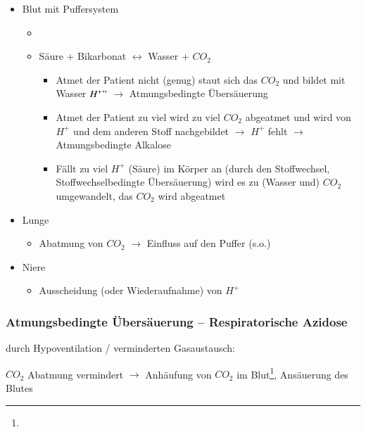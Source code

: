 \begin{itemize}
    \item Blut mit Puffersystem
    \begin{itemize}
        \item {}
        \item Säure {\tiny + Bikarbonat}
        ${\leftrightarrow}$ {\tiny Wasser +} $CO_2$
        \begin{itemize}
            \item Atmet der Patient nicht (genug) staut
            sich das $CO_2$ und bildet mit Wasser $H^+"$
            ${\rightarrow}$ Atmungsbedingte Übersäuerung
            \item Atmet der Patient zu viel wird zu viel
            $CO_2$ abgeatmet und wird von $H^+$ und dem
            anderen Stoff nachgebildet ${\rightarrow}$ $H^+$
            fehlt ${\rightarrow}$ Atmungsbedingte Alkalose
            \item Fällt zu viel $H^+$ (Säure) im
            Körper an (durch den Stoffwechsel, Stoffwechselbedingte Übersäuerung) wird es zu (Wasser
            und) $CO_2$ umgewandelt, das $CO_2$ wird
            abgeatmet
        \end{itemize}
    \end{itemize}
    \item Lunge
    \begin{itemize}
        \item Abatmung von $CO_2$ ${\rightarrow}$ Einfluss auf den Puffer (s.o.)
    \end{itemize}
    \item Niere
    \begin{itemize}
        \item Ausscheidung (oder Wiederaufnahme)  von $H^+$
    \end{itemize}
\end{itemize}

\subsubsection{Atmungsbedingte Übersäuerung --
Respiratorische Azidose} \label{bkm:RefHeading35233321}\label{topic:azidose-respiratorische}durch Hypoventilation / verminderten  Gasaustausch:

$CO_2$  Abatmung vermindert ${\rightarrow}$ Anhäufung von
$CO_2$ im Blut\footnote{}, Ansäuerung des
Blutes


